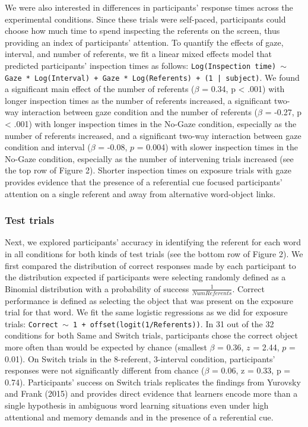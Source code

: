 \documentclass[authoryear, review]{elsarticle}
\begin{document}
We were also interested in differences in participants' response times
across the experimental conditions. Since these trials were self-paced,
participants could choose how much time to spend inspecting the
referents on the screen, thus providing an index of participants'
attention. To quantify the effects of gaze, interval, and number of
referents, we fit a linear mixed effects model that predicted
participants' inspection times as follows:
\texttt{Log(Inspection time) $\sim$ Gaze * Log(Interval) + Gaze * Log(Referents) + (1 | subject)}.
We found a significant main effect of the number of referents (\(\beta\)
= 0.34, p \textless{} .001) with longer inspection times as the number
of referents increased, a significant two-way interaction between gaze
condition and the number of referents (\(\beta\) = -0.27, p \textless{}
.001) with longer inspection times in the No-Gaze condition, especially
as the number of referents increased, and a significant two-way
interaction between gaze condition and interval (\(\beta\) = -0.08,
\(p\) = 0.004) with slower inspection times in the No-Gaze condition,
especially as the number of intervening trials increased (see the top
row of Figure 2). Shorter inspection times on exposure trials with gaze
provides evidence that the presence of a referential cue focused
participants' attention on a single referent and away from alternative
word-object links.

\subsubsection{Test trials}\label{test-trials}

Next, we explored participants' accuracy in identifying the referent for
each word in all conditions for both kinds of test trials (see the
bottom row of Figure 2). We first compared the distribution of correct
responses made by each participant to the distribution expected if
participants were selecting randomly defined as a Binomial distribution
with a probability of success \(\frac{1}{Num Referents}\). Correct
performance is defined as selecting the object that was present on the
exposure trial for that word. We fit the same logistic regressions as we
did for exposure trials:
\texttt{Correct $\sim$ 1 + offset(logit(1/Referents))}. In 31 out of the
32 conditions for both Same and Switch trials, participants chose the
correct object more often than would be expected by chance (smallest
\(\beta\) = 0.36, \(z\) = 2.44, \(p\) = 0.01). On Switch trials in the
8-referent, 3-interval condition, participants' responses were not
significantly different from chance (\(\beta\) = 0.06, z = 0.33, p =
0.74). Participants' success on Switch trials replicates the findings
from Yurovsky and Frank (2015) and provides direct evidence that
learners encode more than a single hypothesis in ambiguous word learning
situations even under high attentional and memory demands and in the
presence of a referential cue.
\end{document}
